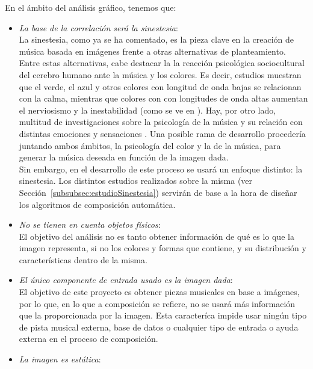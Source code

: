 		En el ámbito del análisis gráfico, tenemos que:
		\begin{itemize}
		
		\item \emph{La base de la correlación será la sinestesia}:
			\vspace{0.1in}
			\\La sinestesia, como ya se ha comentado, es la pieza clave en la creación de música basada en imágenes frente a otras alternativas de planteamiento.\\
			Entre estas alternativas, cabe destacar la la reacción psicológica sociocultural del cerebro humano ante la música y los colores. Es decir, estudios muestran que el verde, el azul y otros colores con longitud de onda bajas se relacionan con la calma, mientras que colores con con longitudes de onda altas aumentan el nerviosismo y la inestabilidad (como se ve en \cite{colorpsy}). Hay, por otro lado, multitud de investigaciones sobre la psicología de la música y su relación con distintas emociones y sensaciones . Una posible rama de desarrollo procedería juntando ambos ámbitos, la psicología del color y la de la música, para generar la música deseada en función de la imagen dada.\\
			Sin embargo, en el desarrollo de este proceso se usará un enfoque distinto: la sinestesia. Los distintos estudios realizados sobre la misma (ver Sección~\ref{subsubsec:estudioSinestesia}) servirán de base a la hora de diseñar los algoritmos de composición automática.
		\item \emph{No se tienen en cuenta objetos físicos}:
			\vspace{0.1in}
			\\El objetivo del análisis no es tanto obtener información de qué es lo que la imagen representa, si no los colores y formas que contiene, y su distribución y características dentro de la misma.
		\item \emph{El único componente de entrada usado es la imagen dada}:
			\vspace{0.1in}
			\\El objetivo de este proyecto es obtener piezas musicales en base a imágenes, por lo que, en lo que a composición se refiere, no se usará más información que la proporcionada por la imagen. Esta caracteríca impide usar ningún tipo de pista musical externa, base de datos o cualquier tipo de entrada o ayuda externa en el proceso de composición.
		\item \emph{La imagen es estática}:

\end{itemize}
